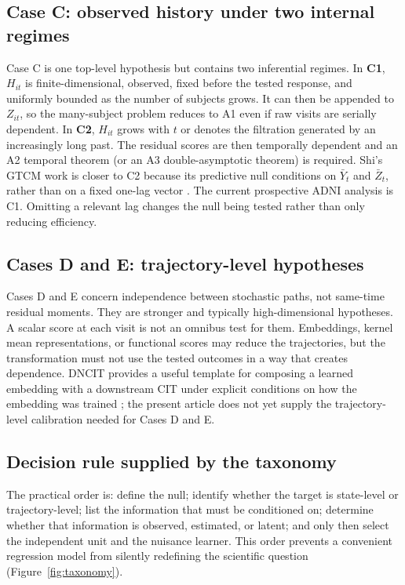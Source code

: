 \documentclass[11pt]{article}
\theoremstyle{definition}
\begin{document}
\subsection{Case C: observed history under two internal regimes}

Case C is one top-level hypothesis but contains two inferential regimes. In \textbf{C1},
$H_{it}$ is finite-dimensional, observed, fixed before the tested response, and uniformly
bounded as the number of subjects grows. It can then be appended to $Z_{it}$, so the
many-subject problem reduces to A1 even if raw visits are serially dependent. In
\textbf{C2}, $H_{it}$ grows with $t$ or denotes the filtration generated by an increasingly
long past. The residual scores are then temporally dependent and an A2 temporal theorem (or
an A3 double-asymptotic theorem) is required. Shi's GTCM work is closer to C2 because its
predictive null conditions on $\bar Y_t$ and $\bar Z_t$, rather than on a fixed one-lag
vector \cite{shi2025}. The current prospective ADNI analysis is C1. Omitting a relevant lag
changes the null being tested rather than only reducing efficiency.

\subsection{Cases D and E: trajectory-level hypotheses}

Cases D and E concern independence between stochastic paths, not same-time residual moments.
They are stronger and typically high-dimensional hypotheses. A scalar score at each visit is
not an omnibus test for them. Embeddings, kernel mean representations, or functional scores
may reduce the trajectories, but the transformation must not use the tested outcomes in a
way that creates dependence. DNCIT provides a useful template for composing a learned
embedding with a downstream CIT under explicit conditions on how the embedding was trained
\cite{simnacher2024}; the present article does not yet supply the trajectory-level calibration
needed for Cases D and E.

\subsection{Decision rule supplied by the taxonomy}

The practical order is: define the null; identify whether the target is state-level or
trajectory-level; list the information that must be conditioned on; determine whether that
information is observed, estimated, or latent; and only then select the independent unit and
the nuisance learner. This order prevents a convenient regression model from silently
redefining the scientific question (Figure~\ref{fig:taxonomy}).
\end{document}
